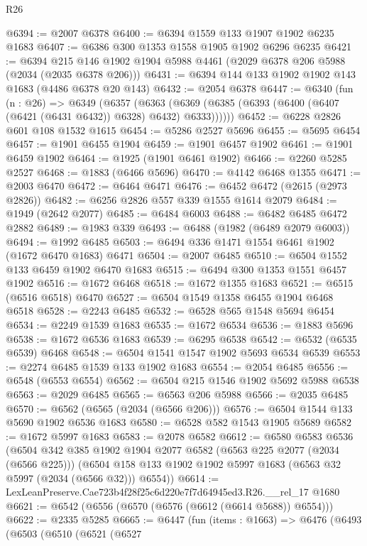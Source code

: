 \begin{lexlean}{R26}
\begin{coremodule}
@6394 := @2007 @6378
@6400 := @6394 @1559 @133 @1907 @1902 @6235 @1683
@6407 := @6386 @300 @1353 @1558 @1905 @1902 @6296 @6235
@6421 := @6394 @215 @146 @1902 @1904 @5988 @4461 (@2029 @6378 @206 @5988 (@2034 (@2035 @6378 @206)))
@6431 := @6394 @144 @133 @1902 @1902 @143 @1683 (@4486 @6378 @20 @143)
@6432 := @2054 @6378
@6447 := @6340
    (fun (n : @26) =>
    @6349
      (@6357
        (@6363 (@6369 (@6385 (@6393 (@6400 (@6407 (@6421 (@6431 @6432)) @6328) @6432) @6333))))))
@6452 := @6228 @2826 @601 @108 @1532 @1615
@6454 := @5286 @2527 @5696
@6455 := @5695 @6454
@6457 := @1901 @6455 @1904
@6459 := @1901 @6457 @1902
@6461 := @1901 @6459 @1902
@6464 := @1925 (@1901 @6461 @1902)
@6466 := @2260 @5285 @2527
@6468 := @1883 (@6466 @5696)
@6470 := @4142 @6468 @1355
@6471 := @2003 @6470
@6472 := @6464 @6471
@6476 := @6452 @6472 (@2615 (@2973 @2826))
@6482 := @6256 @2826 @557 @339 @1555 @1614 @2079
@6484 := @1949 (@2642 @2077)
@6485 := @6484 @6003
@6488 := @6482 @6485 @6472 @2882
@6489 := @1983 @339
@6493 := @6488 (@1982 (@6489 @2079 @6003))
@6494 := @1992 @6485
@6503 := @6494 @336 @1471 @1554 @6461 @1902 (@1672 @6470 @1683) @6471
@6504 := @2007 @6485
@6510 := @6504 @1552 @133 @6459 @1902 @6470 @1683
@6515 := @6494 @300 @1353 @1551 @6457 @1902
@6516 := @1672 @6468
@6518 := @1672 @1355 @1683
@6521 := @6515 (@6516 @6518) @6470
@6527 := @6504 @1549 @1358 @6455 @1904 @6468 @6518
@6528 := @2243 @6485
@6532 := @6528 @565 @1548 @5694 @6454
@6534 := @2249 @1539 @1683
@6535 := @1672 @6534
@6536 := @1883 @5696
@6538 := @1672 @6536 @1683
@6539 := @6295 @6538
@6542 := @6532 (@6535 @6539) @6468
@6548 := @6504 @1541 @1547 @1902 @5693 @6534 @6539
@6553 := @2274 @6485 @1539 @133 @1902 @1683
@6554 := @2054 @6485
@6556 := @6548 (@6553 @6554)
@6562 := @6504 @215 @1546 @1902 @5692 @5988 @6538
@6563 := @2029 @6485
@6565 := @6563 @206 @5988
@6566 := @2035 @6485
@6570 := @6562 (@6565 (@2034 (@6566 @206)))
@6576 := @6504 @1544 @133 @5690 @1902 @6536 @1683
@6580 := @6528 @582 @1543 @1905 @5689
@6582 := @1672 @5997 @1683
@6583 := @2078 @6582
@6612 := @6580
    @6583
    @6536
    (@6504
      @342
      @385
      @1902
      @1904
      @2077
      @6582
      (@6563 @225 @2077 (@2034 (@6566 @225)))
      (@6504 @158 @133 @1902 @1902 @5997 @1683 (@6563 @32 @5997 (@2034 (@6566 @32))) @6554))
@6614 := LexLeanPreserve.Cae723b4f28f25c6d220e7f7d64945ed3.R26.__rel_17 @1680
@6621 := @6542 (@6556 (@6570 (@6576 (@6612 (@6614 @5688)) @6554)))
@6622 := @2335 @5285
@6665 := @6447
    (fun (items : @1663) =>
    @6476
      (@6493
        (@6503
          (@6510
            (@6521
              (@6527

\end{coremodule}
\end{lexlean}

